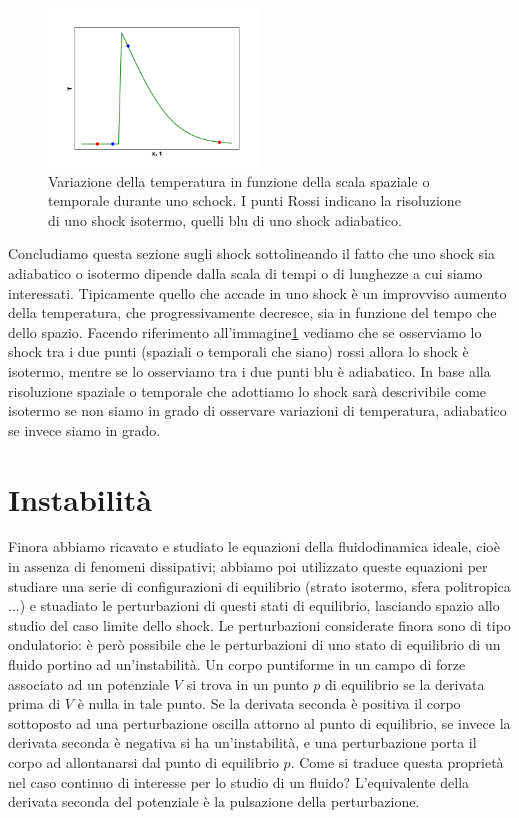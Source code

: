\begin{figure}[h!]
\begin{center}
\includegraphics[width=0.5\textwidth]{Figure_1}
\caption{Variazione della temperatura in funzione della scala spaziale o temporale durante uno schock. I punti Rossi indicano la risoluzione di uno shock isotermo, quelli blu di uno shock adiabatico.} \label{im:Shock}
\end{center}
\end{figure}
Concludiamo questa sezione sugli shock sottolineando il fatto che uno shock sia adiabatico o isotermo dipende dalla scala di tempi o di lunghezze a cui siamo interessati. Tipicamente quello che accade in uno shock è un improvviso aumento della temperatura, che progressivamente decresce, sia in funzione del tempo che dello spazio. Facendo riferimento all'immagine\ref{im:Shock} vediamo che se osserviamo lo shock tra i due punti (spaziali o temporali che siano) rossi allora lo shock è isotermo, mentre se lo osserviamo tra i due punti blu è adiabatico. In base alla risoluzione spaziale o temporale che adottiamo lo shock sarà descrivibile come isotermo se non siamo in grado di osservare variazioni di temperatura, adiabatico se invece siamo in grado.


\section{Instabilità}
Finora abbiamo ricavato e studiato le equazioni della fluidodinamica ideale, cioè in assenza di fenomeni dissipativi; abbiamo poi utilizzato queste equazioni per studiare una serie di configurazioni di equilibrio (strato isotermo, sfera politropica ...) e stuadiato le perturbazioni di questi stati di equilibrio, lasciando spazio allo studio del caso limite dello shock. Le perturbazioni considerate finora sono di tipo ondulatorio: è però possibile che le perturbazioni di uno stato di equilibrio di un fluido portino ad un'instabilità. Un corpo puntiforme in un campo di forze associato ad un potenziale $V$ si trova in un punto $p$ di equilibrio se la derivata prima di $V$ è nulla in tale punto. Se la derivata seconda è positiva il corpo sottoposto ad una perturbazione oscilla attorno al punto di equilibrio, se invece la derivata seconda è negativa si ha un'instabilità, e una perturbazione porta il corpo ad allontanarsi dal punto di equilibrio $p$. Come si traduce questa proprietà nel caso continuo di interesse per lo studio di un fluido? L'equivalente della derivata seconda del potenziale è la pulsazione della perturbazione.

